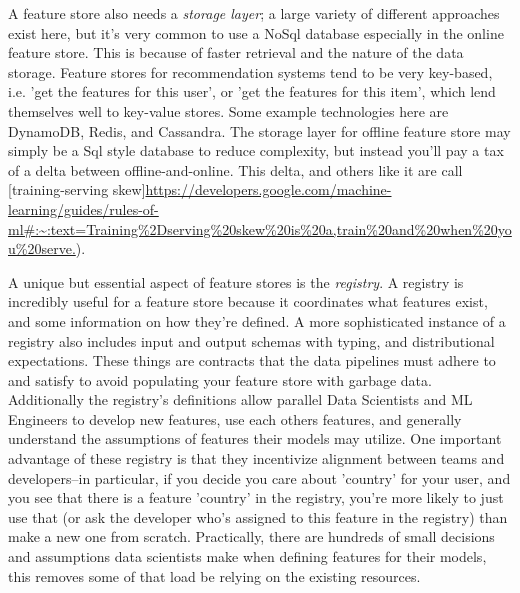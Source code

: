 A feature store also needs a \emph{storage layer}; a large variety of different approaches exist here, but it's very common to use a NoSql database especially in the online feature store. This is because of faster retrieval and the nature of the data storage. Feature stores for recommendation systems tend to be very key-based, i.e. 'get the features for this user', or 'get the features for this item', which lend themselves well to key-value stores. Some example technologies here are DynamoDB, Redis, and Cassandra. The storage layer for offline feature store may simply be a Sql style database to reduce complexity, but instead you'll pay a tax of a delta between offline-and-online. This delta, and others like it are call [training-serving skew]\url{https://developers.google.com/machine-learning/guides/rules-of-ml#:~:text=Training%2Dserving%20skew%20is%20a,train%20and%20when%20you%20serve.}).

A unique but essential aspect of feature stores is the \emph{registry}. A registry is incredibly useful for a feature store because it coordinates what features exist, and some information on how they're defined. A more sophisticated instance of a registry also includes input and output schemas with typing, and distributional expectations. These things are contracts that the data pipelines must adhere to and satisfy to avoid populating your feature store with garbage data. Additionally the registry's definitions allow parallel Data Scientists and ML Engineers to develop new features, use each others features, and generally understand the assumptions of features their models may utilize. One important advantage of these registry is that they incentivize alignment between teams and developers–in particular, if you decide you care about 'country' for your user, and you see that there is a feature 'country' in the registry, you're more likely to just use that (or ask the developer who's assigned to this feature in the registry) than make a new one from scratch. Practically, there are hundreds of small decisions and assumptions data scientists make when defining features for their models, this removes some of that load be relying on the existing resources.

